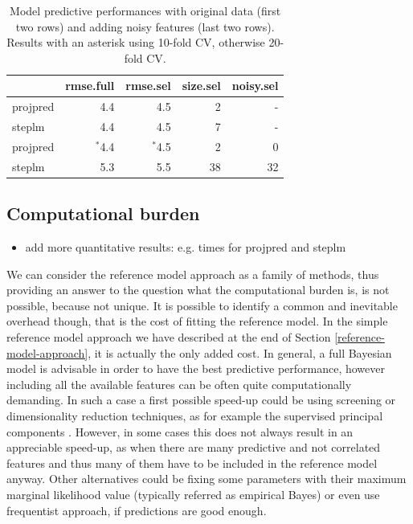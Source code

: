 \documentclass[american,]{article}
\theoremstyle{definition}
\begin{document}
\begin{table}[tp]
\scriptsize
\centering
\begin{tabular}{l|r|r|r|r}
  \hline
 & rmse.full & rmse.sel & size.sel & noisy.sel \\ 
  \hline
projpred & 4.4 & 4.5 & 2 & -  \\
steplm & 4.4 & 4.5 & 7 & - \\
\hline
\hline
projpred & $^{*}$4.4 & $^{*}$4.5 & 2 & 0  \\
steplm & 5.3 & 5.5 & 38 & 32 \\
   \hline
\end{tabular}
\caption{Model predictive performances with original data (first two rows) and adding noisy features (last two rows). Results with an asterisk using 10-fold CV, otherwise 20-fold CV.}
\label{tab:model_performances}
\end{table}

\hypertarget{computational-burden}{%
\subsection{Computational burden} \label{computational-burden}}

\begin{itemize}
\item add more quantitative results: e.g. times for projpred and steplm
\end{itemize}

We can consider the reference model approach as a family of methods, thus providing an answer to the question what the computational burden is, is not possible, because not unique. It is possible to identify a common and inevitable overhead though, that is the cost of fitting the reference model. In the simple reference model approach we have described at the end of Section \ref{reference-model-approach}, it is actually the only added cost. In general, a full Bayesian model is advisable in order to have the best predictive performance, however including all the available features can be often quite computationally demanding. In such a case a first possible speed-up could be using screening or dimensionality reduction techniques, as for example the supervised principal components \citep{paper:original_spc,paper:piironen_spc}. However, in some cases this does not always result in an appreciable speed-up, as when there are many predictive and not correlated features and thus many of them have to be included in the reference model anyway. Other alternatives could be fixing some parameters with their maximum marginal likelihood value (typically referred as empirical Bayes) or even use frequentist approach, if predictions are good enough.
\end{document}
